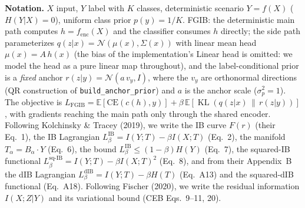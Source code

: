 
\newtheorem{lemma}{Lemma}
\newtheorem{proposition}{Proposition}
\newtheorem{remark}{Remark}

\textbf{Notation.}
$X$ input, $Y$ label with $K$ classes, deterministic scenario $Y = f(X)$ ($H(Y|X) = 0$),
uniform class prior $p(y) = 1/K$.
FGIB: the deterministic main path computes $h = f_{\mathrm{enc}}(X)$ and the classifier
consumes $h$ directly; the side path parameterizes $q(z|x) = \mathcal{N}(\mu(x), \Sigma(x))$
with linear mean head $\mu(x) = A\,h(x)$ (the bias of the implementation's Linear head is
omitted: we model the head as a pure linear map throughout), and the label-conditional
prior is a \emph{fixed}
anchor $r(z|y) = \mathcal{N}(a\,v_y, I)$, where the $v_y$ are orthonormal directions (QR
construction of \texttt{build\_anchor\_prior}) and $a$ is the anchor scale ($\sigma_p^2 = 1$).
The objective is $L_{\mathrm{FGIB}} = \mathbb{E}[\mathrm{CE}(c(h), y)]
+ \beta\,\mathbb{E}[\operatorname{KL}(q(z|x)\,\|\,r(z|y))]$, with gradients reaching the main
path only through the shared encoder.
Following Kolchinsky \& Tracey (2019), we write the IB curve $F(r)$ (their Eq.~1), the IB
Lagrangian $L^{\mathrm{IB}}_\beta = I(Y;T) - \beta I(X;T)$ (Eq.~2), the manifold
$T_\alpha = B_\alpha \cdot Y$ (Eq.~6), the bound $L^{\mathrm{IB}}_\beta \le (1-\beta)H(Y)$
(Eq.~7), the squared-IB functional $L^{\mathrm{sq\text{-}IB}}_\beta = I(Y;T) - \beta I(X;T)^2$
(Eq.~8), and from their Appendix~B the dIB Lagrangian $L^{\mathrm{dIB}}_\beta = I(Y;T) - \beta H(T)$
(Eq.~A13) and the squared-dIB functional (Eq.~A18).
Following Fischer (2020), we write the residual information $I(X;Z|Y)$ and its variational
bound (CEB Eqs.~9--11, 20).

